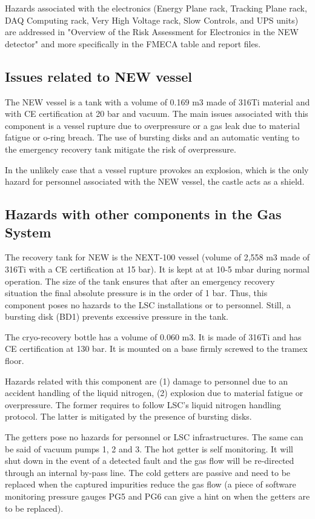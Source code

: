 \documentclass[11pt]{article}
\begin{document}
Hazards associated with the electronics (Energy Plane rack, Tracking Plane rack, DAQ Computing rack, Very High Voltage rack, Slow Controls, and UPS units) are addressed in 
"Overview of the Risk Assessment for Electronics in the NEW detector" and more specifically in the FMECA table and report 
files. 

\subsection{Issues related to NEW vessel}
The NEW vessel is a tank with a volume of 0.169 m3 made of 316Ti material and with CE certification at 20 bar and vacuum. The main issues associated with this component is a vessel rupture due to overpressure or a gas leak due to material fatigue or o-ring breach. 
The use of bursting disks and an automatic venting to the emergency recovery tank mitigate the risk of overpressure.

In the unlikely case that a vessel rupture provokes an explosion, which is the only hazard for personnel associated with the NEW vessel, the castle acts as a shield.

\subsection{Hazards with other components in the Gas System}
The recovery tank for NEW is the NEXT-100 vessel (volume of 2,558 m3 made of 316Ti with a CE certification at 15 bar). 
It is kept at at 10-5 mbar during normal operation. The size of the tank ensures that after an emergency recovery situation the final absolute pressure is in the order of 1 bar. Thus, this component poses no hazards to the LSC installations or to personnel. Still, a bursting disk (BD1) prevents excessive 
pressure in the tank.

The cryo-recovery bottle has a volume of 0.060 m3. It is made of 316Ti and has CE certification at 130 bar. It is mounted on a base firmly screwed to the tramex floor.

Hazards related with this component are (1) damage to personnel due to an accident handling of the liquid nitrogen, (2) explosion due to material fatigue or overpressure. 
The former requires to follow LSC's liquid nitrogen handling protocol. The latter is mitigated by the presence of bursting disks.

The getters pose no hazards for personnel or LSC infrastructures. The same can be said of vacuum pumps 1, 2 and 3. The hot getter is self monitoring. It will shut down in the event of a detected fault and the gas flow will be re-directed through an internal by-pass line. The cold getters are passive and need to be replaced when the captured impurities reduce the gas flow (a piece of software monitoring pressure gauges PG5 and PG6 can give a hint on when the getters are to be replaced).
\end{document}
